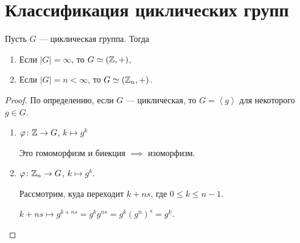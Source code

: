 \section{Классификация циклических групп}

Пусть $G$ --- циклическая группа. Тогда
\begin{enumerate}
    \item Если $|G| = \infty$, то $G \simeq (\mathbb{Z}, +)$,
    \item Если $|G| = n < \infty$, то $G \simeq (\mathbb{Z}_n, +)$.
\end{enumerate}

\begin{proof}
    По определению, если $G$ --- циклическая, то $G = \left< g \right>$ для некоторого $g \in G$.
    \begin{enumerate}
    \item $\varphi \colon \mathbb{Z} \to G$, $k \mapsto g^{k}$

        Это гомоморфизм и биекция $\implies $ изоморфизм.

    \item $\varphi \colon \mathbb{Z}_n \to G$, $k \mapsto g^{k}$.

        Рассмотрим, куда переходит $k + ns$, где $0 \leq k \leq n - 1$.

        $k + ns \mapsto g^{k + ns} = g^{k}g^{ns} = g^{k} (g^{n})^{s} = g^{k}$.
        \qedhere
    \end{enumerate}
\end{proof}
